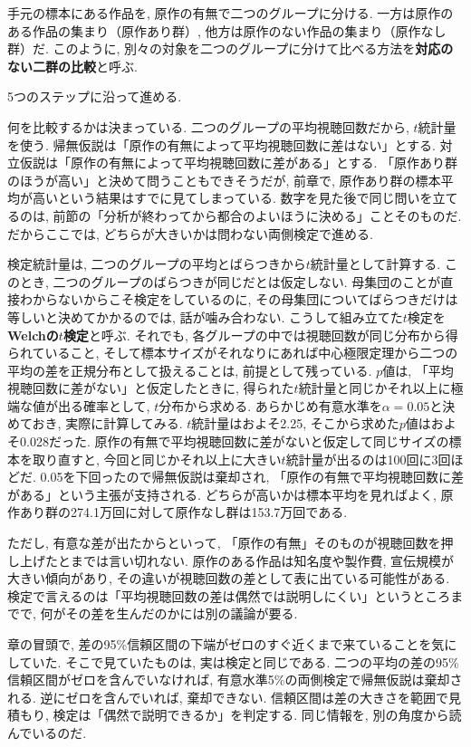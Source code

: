     手元の標本にある作品を, 原作の有無で二つのグループに分ける.
    一方は原作のある作品の集まり（原作あり群）,
    他方は原作のない作品の集まり（原作なし群）だ.
    このように, 別々の対象を二つのグループに分けて比べる方法を\textbf{対応のない二群の比較}と呼ぶ.

    5つのステップに沿って進める.

    何を比較するかは決まっている.
    二つのグループの平均視聴回数だから, $t$統計量を使う.
    帰無仮説は「原作の有無によって平均視聴回数に差はない」とする.
    対立仮説は「原作の有無によって平均視聴回数に差がある」とする.
    「原作あり群のほうが高い」と決めて問うこともできそうだが, 前章で, 原作あり群の標本平均が高いという結果はすでに見てしまっている.
    数字を見た後で同じ問いを立てるのは, 前節の「分析が終わってから都合のよいほうに決める」ことそのものだ.
    だからここでは, どちらが大きいかは問わない両側検定で進める.

    検定統計量は, 二つのグループの平均とばらつきから$t$統計量として計算する.
    このとき, 二つのグループのばらつきが同じだとは仮定しない.
    母集団のことが直接わからないからこそ検定をしているのに, その母集団についてばらつきだけは等しいと決めてかかるのでは, 話が噛み合わない.
    こうして組み立てた$t$検定を\textbf{Welchの$t$検定}と呼ぶ.
    それでも, 各グループの中では視聴回数が同じ分布から得られていること, そして標本サイズがそれなりにあれば中心極限定理から二つの平均の差を正規分布として扱えることは, 前提として残っている.
    $p$値は, 「平均視聴回数に差がない」と仮定したときに, 得られた$t$統計量と同じかそれ以上に極端な値が出る確率として, $t$分布から求める.
    あらかじめ有意水準を$\alpha = 0.05$と決めておき, 実際に計算してみる.
    $t$統計量はおよそ2.25, そこから求めた$p$値はおよそ0.028だった.
    原作の有無で平均視聴回数に差がないと仮定して同じサイズの標本を取り直すと, 今回と同じかそれ以上に大きい$t$統計量が出るのは100回に3回ほどだ.
    0.05を下回ったので帰無仮説は棄却され, 「原作の有無で平均視聴回数に差がある」という主張が支持される.
    どちらが高いかは標本平均を見ればよく, 原作あり群の274.1万回に対して原作なし群は153.7万回である.

    ただし, 有意な差が出たからといって, 「原作の有無」そのものが視聴回数を押し上げたとまでは言い切れない.
    原作のある作品は知名度や製作費, 宣伝規模が大きい傾向があり, その違いが視聴回数の差として表に出ている可能性がある.
    検定で言えるのは「平均視聴回数の差は偶然では説明しにくい」というところまでで, 何がその差を生んだのかには別の議論が要る.

    章の冒頭で, 差の95\%信頼区間の下端がゼロのすぐ近くまで来ていることを気にしていた.
    そこで見ていたものは, 実は検定と同じである.
    二つの平均の差の95\%信頼区間がゼロを含んでいなければ, 有意水準5\%の両側検定で帰無仮説は棄却される.
    逆にゼロを含んでいれば, 棄却できない.
    信頼区間は差の大きさを範囲で見積もり, 検定は「偶然で説明できるか」を判定する.
    同じ情報を, 別の角度から読んでいるのだ.


